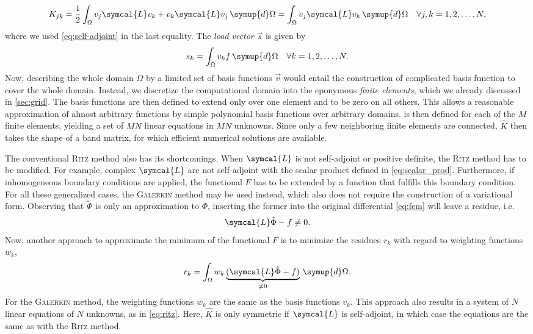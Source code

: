\begin{gather}
  K_{jk} = \frac{1}{2} \int_{\Omega} v_{j} \symcal{L} v_{k} + v_{k} \symcal{L} v_{j} \, \symup{d} \Omega = \int_{\Omega} v_{j} \symcal{L} v_{k} \, \symup{d} \Omega \quad \forall j, k = 1, 2, \dotsc, N,
\end{gather}
where we used \cref{eq:self-adjoint} in the last equality. The \emph{load vector} $\vec{s}$ is given by
\begin{gather}
  s_{k} = \int_{\Omega} v_{k} f \, \symup{d} \Omega \quad \forall k = 1, 2, \dotsc, N.
\end{gather}
Now, describing the whole domain $\Omega$ by a limited set of basis functions $\vec{v}$ would entail the construction of complicated basis function to cover the whole domain. Instead, we discretize the computational domain into the eponymous \emph{finite elements}, which we already discussed in \cref{sec:grid}. The basis functions are then defined to extend only over one element and to be zero on all others. This allows a reasonable approximation of almost arbitrary functions by simple polynomial basis functions over arbitrary domains.  is then defined for each of the $M$ finite elements, yielding a set of $M N$ linear equations in $M N$ unknowns. Since only a few neighboring finite elements are connected, $\hat{K}$ then takes the shape of a band matrix, for which efficient numerical solutions are available.

The conventional \textsc{Ritz} method also has its shortcomings. When $\symcal{L}$ is not self-adjoint or positive definite, the \textsc{Ritz} method has to be modified. For example, complex $\symcal{L}$ are not self-adjoint with the scalar product defined in \cref{eq:scalar_prod}. Furthermore, if inhomogeneous boundary conditions are applied, the functional $F$ has to be extended by a function that fulfills this boundary condition. For all these generalized cases, the \textsc{Galerkin} method may be used instead, which also does not require the construction of a variational form. Observing that $\tilde{\Phi}$ is only an approximation to $\Phi$, inserting the former into the original differential \cref{eq:fem} will leave a residue, i.e.
\begin{gather}
  \symcal{L} \tilde{\Phi} - f \neq 0.
\end{gather}
Now, another approach to approximate the minimum of the functional $F$ is to minimize the residues $r_{k}$ with regard to weighting functions $w_{k}$,
\begin{gather}
  r_{k} = \int_{\Omega} w_{k} \underbrace{(\symcal{L} \tilde{\Phi} - f)}_{\neq 0} \, \symup{d} \Omega.
\end{gather}
For the \textsc{Galerkin} method, the weighting functions $w_{k}$ are the same as the basis functions $v_{k}$. This approach also results in a system of $N$ linear equations of $N$ unknowns, as in \cref{eq:ritz}. Here, $\hat{K}$ is only symmetric if $\symcal{L}$ is self-adjoint, in which case the equations are the same as with the \textsc{Ritz} method.

